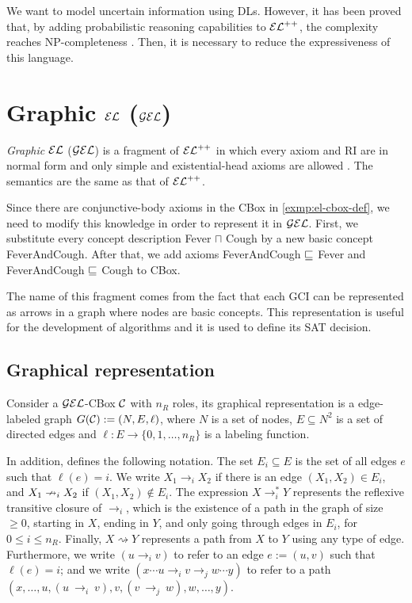 We want to model uncertain information using DLs. However, it has been proved that, by adding probabilistic reasoning capabilities to $\mathcal{EL}^{++}$, the complexity reaches NP-completeness \citep{Fin2019b}. Then, it is necessary to reduce the expressiveness of this language.

\section{Graphic \texorpdfstring{$\mathcal{EL}$}{EL} (\texorpdfstring{$\mathcal{GEL}$}{GEL})}
\label{sec:gel}

\emph{Graphic} $\mathcal{EL}$ ($\mathcal{GEL}$) is a fragment of $\mathcal{EL}^{++}$ in which every axiom and RI are in normal form and only simple and existential-head axioms are allowed \citep{Fin2020}. The semantics are the same as that of $\mathcal{EL}^{++}$.

\begin{example}
	\label{exmp:gel-def}
	Since there are conjunctive-body axioms in the CBox in \cref{exmp:el-cbox-def}, we need to modify this knowledge in order to represent it in $\mathcal{GEL}$. First, we substitute every concept description {\sffamily Fever $\sqcap$ Cough} by a new basic concept  {\sffamily FeverAndCough}. After that, we add axioms {\sffamily FeverAndCough $\sqsubseteq$ Fever} and {\sffamily FeverAndCough $\sqsubseteq$ Cough} to CBox.
\end{example}

The name of this fragment comes from the fact that each GCI can be represented as arrows in a graph where nodes are basic concepts. This representation is useful for the development of algorithms and it is used to define its SAT decision.

\subsection{Graphical representation}
\label{subsec:graph-repr}

Consider a $\mathcal{GEL}$-CBox $\mathcal{C}$ with $n_R$ roles, its graphical representation is a edge-labeled graph $G(\mathcal{C}) := (N, E, \ell)$, where $N$ is a set of nodes, $E \subseteq N^2$ is a set of directed edges and $\ell: E \to \{0, 1, \dots, n_R\}$ is a labeling function.

In addition, \citet{Fin2020} defines the following notation. The set $E_i \subseteq E$ is the set of all edges $e$ such that $\ell(e) = i$. We write $X_1 \to_i X_2$ if there is an edge $(X_1, X_2) \in E_i$, and $X_1 \nrightarrow_i X_2$ if $(X_1, X_2) \not\in E_i$. The expression $X \to_i^* Y$ represents the reflexive transitive closure of $\to_i$, which is the existence of a path in the graph of size $\geq 0$, starting in $X$, ending in $Y$, and only going through edges in $E_i$, for $0 \leq i \leq n_R$. Finally, $X \rightsquigarrow Y$ represents a path from $X$ to $Y$ using any type of edge. Furthermore, we write $(u \to_i v)$ to refer to an edge $e := (u, v)$ such that $\ell(e) = i$; and we write $(x \cdots u \to_i v \to_j w \cdots y)$ to refer to a path~$(x, \dots, u, (u~\to_i~v), v, (v~\to_j~w), w, \dots, y)$.

